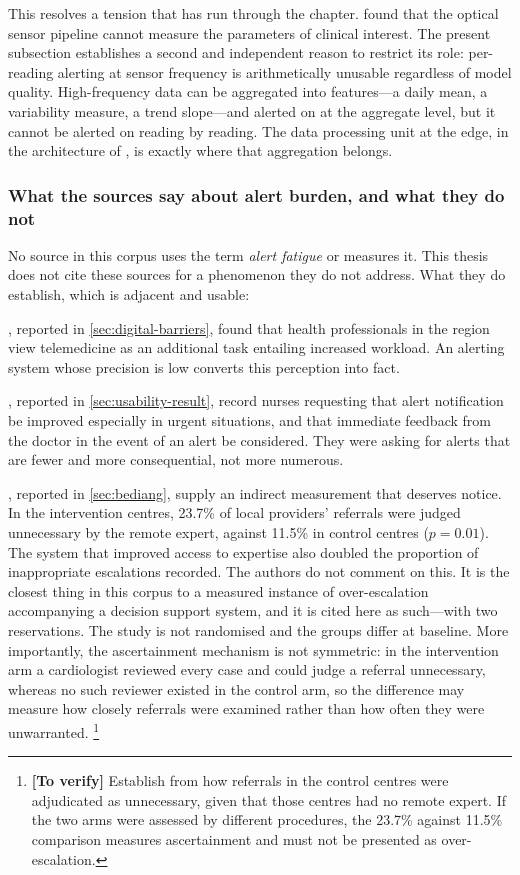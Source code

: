 \documentclass[12pt,a4paper,oneside]{report}
\newcommand{\verify}[1]{\footnote{\textbf{[To verify]} #1}}
\begin{document}
This resolves a tension that has run through the chapter.  found that the optical sensor pipeline cannot measure the parameters of clinical interest. The present subsection establishes a second and independent reason to restrict its role: per-reading alerting at sensor frequency is arithmetically unusable regardless of model quality. High-frequency data can be aggregated into features---a daily mean, a variability measure, a trend slope---and alerted on at the aggregate level, but it cannot be alerted on reading by reading. The data processing unit at the edge, in the architecture of \textcite{mucchi2021}, is exactly where that aggregation belongs.

\subsubsection{What the sources say about alert burden, and what they do not}

No source in this corpus uses the term \emph{alert fatigue} or measures it. This thesis does not cite these sources for a phenomenon they do not address. What they do establish, which is adjacent and usable:

\Textcite{dodoo2022}, reported in \cref{sec:digital-barriers}, found that health professionals in the region view telemedicine as an additional task entailing increased workload. An alerting system whose precision is low converts this perception into fact.

\Textcite{mucchi2021}, reported in \cref{sec:usability-result}, record nurses requesting that alert notification be improved especially in urgent situations, and that immediate feedback from the doctor in the event of an alert be considered. They were asking for alerts that are fewer and more consequential, not more numerous.

\Textcite{bediang2021}, reported in \cref{sec:bediang}, supply an indirect measurement that deserves notice. In the intervention centres, 23.7\% of local providers' referrals were judged unnecessary by the remote expert, against 11.5\% in control centres ($p = 0.01$). The system that improved access to expertise also doubled the proportion of inappropriate escalations recorded. The authors do not comment on this. It is the closest thing in this corpus to a measured instance of over-escalation accompanying a decision support system, and it is cited here as such---with two reservations. The study is not randomised and the groups differ at baseline. More importantly, the ascertainment mechanism is not symmetric: in the intervention arm a cardiologist reviewed every case and could judge a referral unnecessary, whereas no such reviewer existed in the control arm, so the difference may measure how closely referrals were examined rather than how often they were unwarranted.%
\verify{Establish from \textcite{bediang2021} how referrals in the control centres were adjudicated as unnecessary, given that those centres had no remote expert. If the two arms were assessed by different procedures, the 23.7\% against 11.5\% comparison measures ascertainment and must not be presented as over-escalation.}
\end{document}
